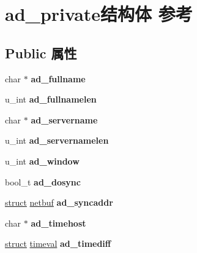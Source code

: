 \hypertarget{structad__private}{}\section{ad\+\_\+private结构体 参考}
\label{structad__private}
\subsection*{Public 属性}
\begin{DoxyCompactItemize}
\item 
\mbox{\label{structad__private_a2e2825a9181db62ae6937a5b546b1357}} 
char $\ast$ {\bfseries ad\+\_\+fullname}
\item 
\mbox{\label{structad__private_a2acf0889b4c44231e07ac3c6ceeb30b7}} 
u\+\_\+int {\bfseries ad\+\_\+fullnamelen}
\item 
\mbox{\label{structad__private_ad877ce0080fb884f36ab88f66809e77e}} 
char $\ast$ {\bfseries ad\+\_\+servername}
\item 
\mbox{\label{structad__private_a630bd7460010e810d6793d052fae8fc1}} 
u\+\_\+int {\bfseries ad\+\_\+servernamelen}
\item 
\mbox{\label{structad__private_a58aa42ee5d46869a4ecf0c781d24fda7}} 
u\+\_\+int {\bfseries ad\+\_\+window}
\item 
\mbox{\label{structad__private_a1473d554deec70f77a7ee230b090b77b}} 
bool\+\_\+t {\bfseries ad\+\_\+dosync}
\item 
\mbox{\label{structad__private_aa539813807a4c36c735c92600c9a1c0e}} 
\hyperlink{interfacestruct}{struct} \hyperlink{structnetbuf}{netbuf} {\bfseries ad\+\_\+syncaddr}
\item 
\mbox{\label{structad__private_a00a5fd252b065ee7c46cf5b70a7cd89a}} 
char $\ast$ {\bfseries ad\+\_\+timehost}
\item 
\mbox{\label{structad__private_ad0de21741145a0d551f3df9492fb886a}} 
\hyperlink{interfacestruct}{struct} \hyperlink{structtimeval}{timeval} {\bfseries ad\+\_\+timediff}

\end{DoxyCompactItemize}

